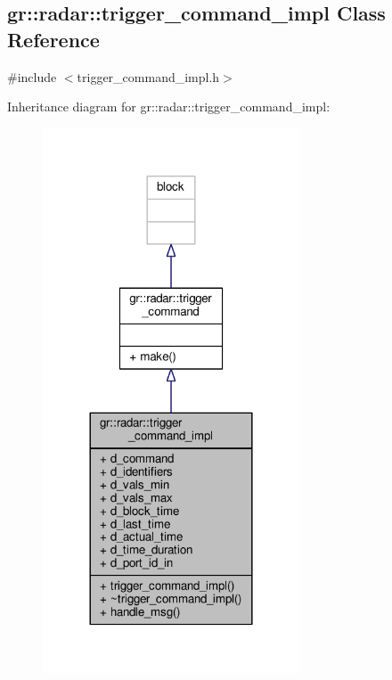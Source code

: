 \subsection{gr\+:\+:radar\+:\+:trigger\+\_\+command\+\_\+impl Class Reference}
\label{classgr_1_1radar_1_1trigger__command__impl}


{\ttfamily \#include $<$trigger\+\_\+command\+\_\+impl.\+h$>$}



Inheritance diagram for gr\+:\+:radar\+:\+:trigger\+\_\+command\+\_\+impl\+:
\nopagebreak
\begin{figure}[H]
\begin{center}
\leavevmode
\includegraphics[width=216pt]{d2/d43/classgr_1_1radar_1_1trigger__command__impl__inherit__graph}
\end{center}
\end{figure}


